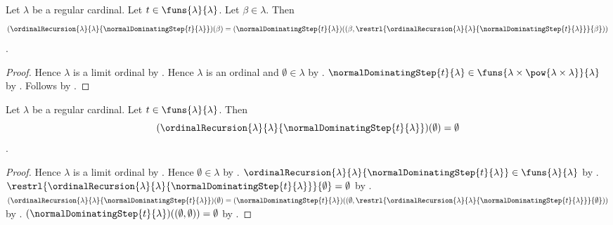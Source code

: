 \begin{proposition}\label{normal_dominating_recursion_equation}
    Let $\lambda$ be a regular cardinal.
    Let $t\in\funs{\lambda}{\lambda}$.
    Let $\beta\in\lambda$.
    Then
    \[
        (\ordinalRecursion{\lambda}{\lambda}
            {\normalDominatingStep{t}{\lambda}})(\beta)
        =(\normalDominatingStep{t}{\lambda})
            ((\beta,\restrl{\ordinalRecursion{\lambda}{\lambda}
                {\normalDominatingStep{t}{\lambda}}}{\beta}))
    \].
\end{proposition}
\begin{proof}
    Hence $\lambda$ is a limit ordinal by
        .
    Hence $\lambda$ is an ordinal and $\emptyset\in\lambda$ by
        .
    $\normalDominatingStep{t}{\lambda}
        \in\funs{\lambda\times\pow{\lambda\times\lambda}}{\lambda}$ by
        .
    Follows by .
\end{proof}

\begin{proposition}\label{normal_dominating_recursion_zero}
    Let $\lambda$ be a regular cardinal.
    Let $t\in\funs{\lambda}{\lambda}$.
    Then
    \[
        (\ordinalRecursion{\lambda}{\lambda}
            {\normalDominatingStep{t}{\lambda}})(\emptyset)
        =\emptyset
    \].
\end{proposition}
\begin{proof}
    Hence $\lambda$ is a limit ordinal by
        .
    Hence $\emptyset\in\lambda$ by .
    $\ordinalRecursion{\lambda}{\lambda}
            {\normalDominatingStep{t}{\lambda}}
        \in\funs{\lambda}{\lambda}$ by
        .
    $\restrl{\ordinalRecursion{\lambda}{\lambda}
        {\normalDominatingStep{t}{\lambda}}}{\emptyset}=\emptyset$ by
        .
    $(\ordinalRecursion{\lambda}{\lambda}
            {\normalDominatingStep{t}{\lambda}})(\emptyset)
        =(\normalDominatingStep{t}{\lambda})
            ((\emptyset,\restrl{\ordinalRecursion{\lambda}{\lambda}
                {\normalDominatingStep{t}{\lambda}}}{\emptyset}))$ by
        .
    $(\normalDominatingStep{t}{\lambda})((\emptyset,\emptyset))
        =\emptyset$ by
        .
\end{proof}

